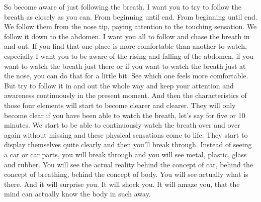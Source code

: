 \documentclass[letterpaper,10pt,english]{sphinxmanual}
\begin{document}
\sphinxAtStartPar
So  become  aware  of  just  following  the  breath.  I  want  you  to  try  to
follow  the  breath  as  closely  as  you  can.  From  beginning  until  end.  From
beginning until end. We follow them from the nose tip, paying attention to
the touching sensation. We follow it down to the abdomen. I want you all
to follow and chase the breath in and out. If you find that one place is more
comfortable than another to watch, especially I want you to be aware of the
rising and falling of the abdomen, if you want to watch the breath just there
or if you want to watch the breath just at the nose, you can do that for a little
bit. See which one feels more comfortable. But try to follow it in and out the
whole way and keep your attention and awareness continuously in the present moment. And then the characteristics of those four elements will start to
become clearer and clearer. They will only become clear if you have been
able to watch the breath, let’s say for five or 10 minutes. We start to be able
to continuously watch the breath over and over again without missing and
these physical sensations come to life. They start to display themselves quite
clearly and then you’ll break through. Instead of seeing a car or car parts,
you  will    break  through  and  you  will  see  metal,  plastic,  glass  and  rubber.
You will see the actual reality behind the concept of car, behind the concept
of breathing, behind the concept of body. You will see actually what is there.
And it will surprise you. It will shock you. It will amaze you, that the mind
can actually know the body in such away.
\end{document}

